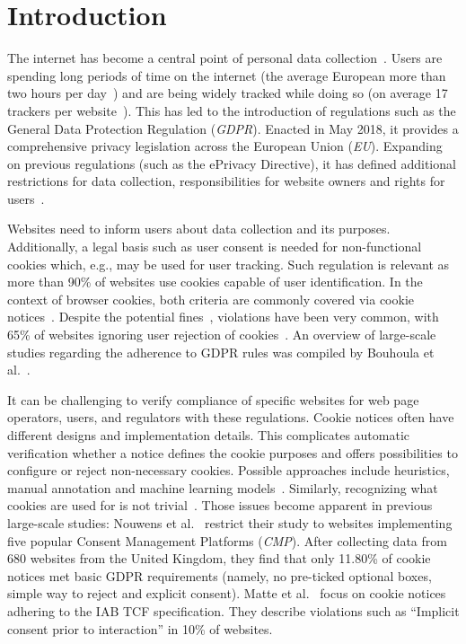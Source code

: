 \chapter{Introduction} \label{chap:introduction}

The internet has become a central point of personal data collection~\cite{kretschmer2021cookie}.
Users are spending long periods of time on the internet (the average European more than two hours per day~\cite{kretschmer2021cookie}) and are being widely tracked while doing so (on average 17 trackers per website~\cite{kretschmer2021cookie}).
This has led to the introduction of regulations such as the General Data Protection Regulation (\emph{GDPR}). 
Enacted in May 2018, it provides a comprehensive privacy legislation across the European Union (\emph{EU}).
Expanding on previous regulations (such as the ePrivacy Directive), it has defined additional restrictions for data collection, responsibilities for website owners and rights for users~\cite{kretschmer2021cookie}.

Websites need to inform users about data collection and its purposes.
Additionally, a legal basis such as user consent is needed for non-functional cookies which, e.g., may be used for user tracking.
Such regulation is relevant as more than 90\% of websites use cookies capable of user identification.
In the context of browser cookies, both criteria are commonly covered via cookie notices~\cite{bouhoula2023automated}.
Despite the potential fines~\cite{sanchez_rola2019can}, violations have been very common, with 65\% of websites ignoring user rejection of cookies~\cite{bouhoula2023automated}.
An overview of large-scale studies regarding the adherence to GDPR rules was compiled by Bouhoula et al.~\cite{bouhoula2023automated}.

It can be challenging to verify compliance of specific websites for web page operators, users, and regulators with these regulations.
Cookie notices often have different designs and implementation details.
This complicates automatic verification whether a notice defines the cookie purposes and offers possibilities to configure or reject non-necessary cookies.
Possible approaches include heuristics, manual annotation and machine learning models~\cite{kretschmer2021cookie, bouhoula2023automated}.
Similarly, recognizing what cookies are used for is not trivial~\cite{sanchez_rola2019can, bollinger2022automating}.
Those issues become apparent in previous large-scale studies:
Nouwens et al.~\cite{nouwens2020dark} restrict their study to websites implementing five popular Consent Management Platforms (\emph{CMP}).
After collecting data from 680 websites from the United Kingdom, they find that only 11.80\% of cookie notices met basic GDPR requirements (namely, no pre-ticked optional boxes, simple way to reject and explicit consent).
Matte et al.~\cite{matte2020cookiebannersrespectchoice} focus on cookie notices adhering to the IAB TCF specification.
They describe violations such as \enquote{Implicit consent prior to interaction} in 10\% of websites.

